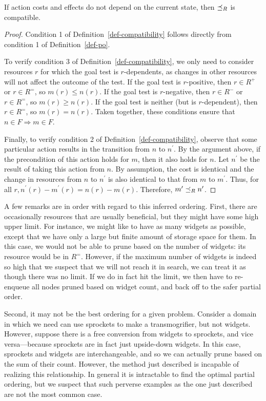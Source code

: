 \documentclass[letterpaper]{article}
\theoremstyle{plain} \newtheorem{theorem}{Theorem} \newtheorem{proposition}{Proposition} \newtheorem{lemma}{Lemma}
\theoremstyle{definition} \newtheorem{definition}{Definition} \newtheorem{conjecture}{Conjecture} \newtheorem*{example}{Example}
\theoremstyle{remark} \newtheorem*{remark}{Remark} \newtheorem*{note}{Note} \newtheorem{case}{Case}
\begin{document}
\begin{claim}{}{\label{clm-po-compatible}}
	If action costs and effects do not depend on the current state, then $\preceq_R$ is compatible.
\end{claim}
\begin{proof}
	Condition 1 of Definition~\ref{def-compatibility} follows directly from condition 1 of Definition~\ref{def-po}.
	
	To verify condition 3 of Definition~\ref{def-compatibility},
  we only need to consider resources $r$ for which the goal
  test is $r$-dependents, as changes in other resources will
  not affect the outcome of the test. If the goal test is
  $r$-positive, then $r \in R^+$ or $r \in R^=$, so $m(r) \le n(r)$. If the goal test is $r$-negative, then $r \in R^-$ or $r \in R^=$, so $m(r) \ge n(r)$. If the goal test is neither (but is $r$-dependent), then $r \in R^=$, so $m(r) = n(r)$. Taken together, these conditions ensure that $n \in F \Rightarrow m \in F$.
	
	Finally, to verify condition 2 of Definition~\ref{def-compatibility}, observe that some particular action results in the transition from $n$ to $n^\prime$. By the argument above, if the precondition of this action holds for $m$, then it also holds for $n$. Let
  $n^\prime$ be the result of taking this action from $n$. By
  assumption, the cost is identical and the change in resources
  from $n$ to $n^\prime$ is also identical to that from $m$ to
  $m^\prime$. Thus, for all $r, n^\prime(r) -
  m^\prime(r) = n(r) - m(r)$. Therefore, $m^\prime \preceq_R n^\prime$.
\end{proof}

A few remarks are in order with regard to this inferred ordering.
First, there are occasionally resources that are usually beneficial,
but they might have some high upper limit. For instance, we might
like to have as many widgets as possible, except that we have only
a large but finite amount of storage space for them.  In this case,
we would not be able to prune based on the number of widgets: its
resource would be in $R^=$. However, if the maximum number of widgets
is indeed so high that we suspect that we will not reach it in
search, we can treat it as though there was no limit. If we do in
fact hit the limit, we then have to re-enqueue all nodes pruned
based on widget count, and back off to the safer partial order.

Second, it may not be the best ordering for a given problem. Consider
a domain in which we need can use sprockets to make a transmogrifier,
but not widgets. However, suppose there is a free conversion from
widgets to sprockets, and vice versa---because sprockets are in
fact just upside-down widgets. In this case, sprockets and widgets
are interchangeable, and so we can actually prune based on the sum
of their count. However, the method just described is incapable of
realizing this relationship. In general it is intractable to find
the optimal partial ordering, but we suspect that such perverse
examples as the one just described are not the most common case.
\end{document}
